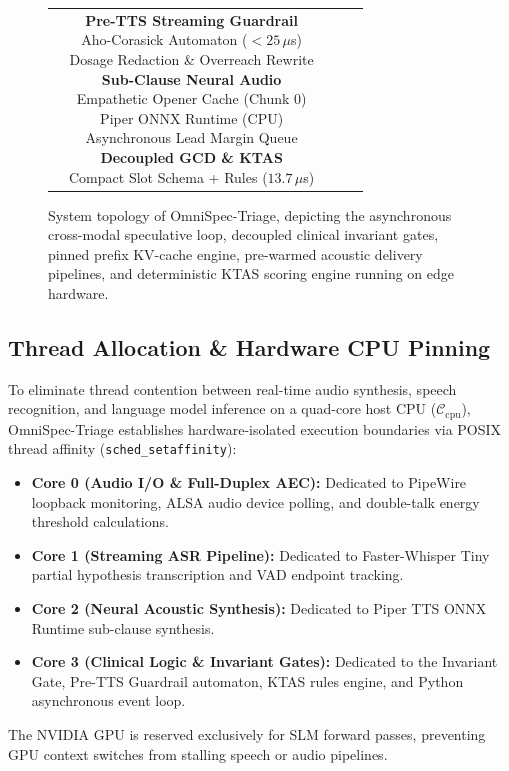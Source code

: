 \documentclass[10pt,journal,compsoc]{IEEEtran}
\begin{document}
\begin{figure}[!t]
{{{\begin{tabular}{ccccc}
& \parbox{0.30\textwidth}{\centering \textbf{Pre-TTS Streaming Guardrail}\\ Aho-Corasick Automaton ($<25\,\mu$s)\\ Dosage Redaction \& Overreach Rewrite\\ \vspace{3pt} \textbf{Sub-Clause Neural Audio}\\ Empathetic Opener Cache (Chunk 0)\\ Piper ONNX Runtime (CPU)\\ Asynchronous Lead Margin Queue\\ \vspace{3pt} \textbf{Decoupled GCD \& KTAS}\\ Compact Slot Schema + Rules ($13.7\,\mu$s)} \\
\bottomrule
\end{tabular}%
}
\vspace{3pt}
}}
\caption{System topology of OmniSpec-Triage, depicting the asynchronous cross-modal speculative loop, decoupled clinical invariant gates, pinned prefix KV-cache engine, pre-warmed acoustic delivery pipelines, and deterministic KTAS scoring engine running on edge hardware.}
\label{fig:architecture_overview}
\end{figure}

\subsection{Thread Allocation \& Hardware CPU Pinning}
To eliminate thread contention between real-time audio synthesis, speech recognition, and language model inference on a quad-core host CPU ($\mathcal{C}_{\text{cpu}}$), OmniSpec-Triage establishes hardware-isolated execution boundaries via POSIX thread affinity (\texttt{sched\_setaffinity}):
\begin{itemize}
    \item \textbf{Core 0 (Audio I/O \& Full-Duplex AEC):} Dedicated to PipeWire loopback monitoring, ALSA audio device polling, and double-talk energy threshold calculations.
    \item \textbf{Core 1 (Streaming ASR Pipeline):} Dedicated to Faster-Whisper Tiny partial hypothesis transcription and VAD endpoint tracking.
    \item \textbf{Core 2 (Neural Acoustic Synthesis):} Dedicated to Piper TTS ONNX Runtime sub-clause synthesis.
    \item \textbf{Core 3 (Clinical Logic \& Invariant Gates):} Dedicated to the Invariant Gate, Pre-TTS Guardrail automaton, KTAS rules engine, and Python asynchronous event loop.
\end{itemize}
The NVIDIA GPU is reserved exclusively for SLM forward passes, preventing GPU context switches from stalling speech or audio pipelines.
\end{document}
